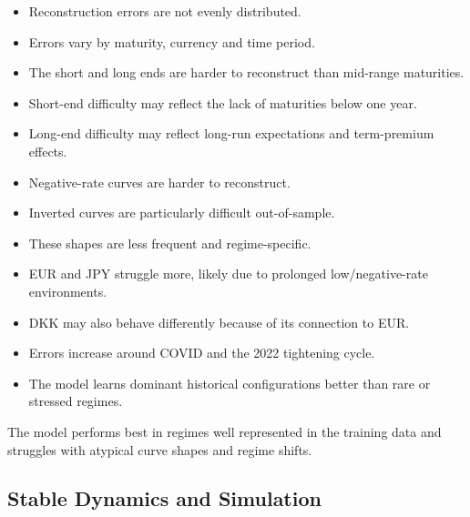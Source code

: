 \begin{itemize}
    \item Reconstruction errors are not evenly distributed.
    \item Errors vary by maturity, currency and time period.
    \item The short and long ends are harder to reconstruct than mid-range maturities.
    \item Short-end difficulty may reflect the lack of maturities below one year.
    \item Long-end difficulty may reflect long-run expectations and term-premium effects.
    \item Negative-rate curves are harder to reconstruct.
    \item Inverted curves are particularly difficult out-of-sample.
    \item These shapes are less frequent and regime-specific.
    \item EUR and JPY struggle more, likely due to prolonged low/negative-rate environments.
    \item DKK may also behave differently because of its connection to EUR.
    \item Errors increase around COVID and the 2022 tightening cycle.
    \item The model learns dominant historical configurations better than rare or stressed regimes.
\end{itemize}

The model performs best in regimes well represented in the training data and struggles with atypical curve shapes and regime shifts.

\subsection{Stable Dynamics and Simulation}


